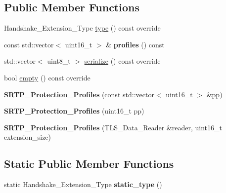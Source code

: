 \subsection*{Public Member Functions}
\begin{DoxyCompactItemize}
\item 
Handshake\+\_\+\+Extension\+\_\+\+Type \hyperlink{class_botan_1_1_t_l_s_1_1_s_r_t_p___protection___profiles_a7d0e938631996e86ceab9f94092f9119}{type} () const override
\item 
\mbox{\label{class_botan_1_1_t_l_s_1_1_s_r_t_p___protection___profiles_a333448e154b78ae1e51ffb48772f373d}} 
const std\+::vector$<$ uint16\+\_\+t $>$ \& {\bfseries profiles} () const
\item 
std\+::vector$<$ uint8\+\_\+t $>$ \hyperlink{class_botan_1_1_t_l_s_1_1_s_r_t_p___protection___profiles_a095ee67aaf18e75768f6fcca0fa16ac6}{serialize} () const override
\item 
bool \hyperlink{class_botan_1_1_t_l_s_1_1_s_r_t_p___protection___profiles_a4b6f1e03445601ca122e036c03e1dcbb}{empty} () const override
\item 
\mbox{\label{class_botan_1_1_t_l_s_1_1_s_r_t_p___protection___profiles_a5a10843ddeb7cdeea9fbf5284a1a7878}} 
{\bfseries S\+R\+T\+P\+\_\+\+Protection\+\_\+\+Profiles} (const std\+::vector$<$ uint16\+\_\+t $>$ \&pp)
\item 
\mbox{\label{class_botan_1_1_t_l_s_1_1_s_r_t_p___protection___profiles_a15f337b05fa101665e4241c4662ba9ca}} 
{\bfseries S\+R\+T\+P\+\_\+\+Protection\+\_\+\+Profiles} (uint16\+\_\+t pp)
\item 
\mbox{\label{class_botan_1_1_t_l_s_1_1_s_r_t_p___protection___profiles_a2eeedb34d89e8d0c142b57d30f440a3c}} 
{\bfseries S\+R\+T\+P\+\_\+\+Protection\+\_\+\+Profiles} (T\+L\+S\+\_\+\+Data\+\_\+\+Reader \&reader, uint16\+\_\+t extension\+\_\+size)
\end{DoxyCompactItemize}
\subsection*{Static Public Member Functions}
\begin{DoxyCompactItemize}
\item 
\mbox{\label{class_botan_1_1_t_l_s_1_1_s_r_t_p___protection___profiles_ac66d235f88a4f064b64893ea573a50b8}} 
static Handshake\+\_\+\+Extension\+\_\+\+Type {\bfseries static\+\_\+type} ()
\end{DoxyCompactItemize}


